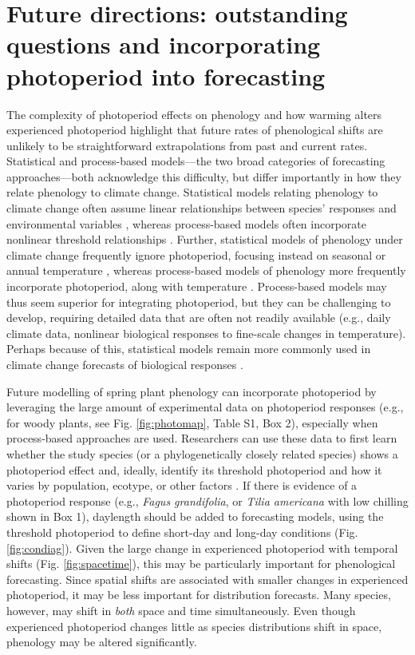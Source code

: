 \documentclass{article}
\begin{document}
\section*{Future directions: outstanding questions and incorporating photoperiod into forecasting}
\par The complexity of photoperiod effects on phenology and how warming alters experienced photoperiod highlight that future rates of phenological shifts are unlikely to be straightforward extrapolations from past and current rates. Statistical and process-based models---the two broad categories of forecasting approaches---both acknowledge this difficulty, but differ importantly in how they relate phenology to climate change. Statistical models relating phenology to climate change often assume linear relationships between species' responses and environmental variables \citep[e.g., ][]{flynn2018,ibanez2010}, whereas process-based models often incorporate nonlinear threshold relationships \citep[e.g.][]{chuine2001,morin2009}. Further, statistical models of phenology under climate change frequently ignore photoperiod, focusing instead on seasonal or annual temperature \citep[e.g.][but see \citet{richardson2013}]{diez2012,ibanez2010}, whereas process-based models of phenology more frequently incorporate photoperiod, along with temperature \citep{lundell2020,duputie2015,zhao2013,morin2009}. Process-based models may thus seem superior for integrating photoperiod, but they can be challenging to develop, requiring detailed data that are often not readily available (e.g., daily climate data, nonlinear biological responses to fine-scale changes in temperature). Perhaps because of this, statistical models remain more commonly used in climate change forecasts of biological responses \citep[e.g.,][]{garcia2016,Basler:2012,diez2012,zhu2012,ibanez2010}.

\par Future modelling of spring plant phenology can incorporate photoperiod by leveraging the large amount of experimental data on photoperiod responses (e.g., for woody plants, see Fig. \ref{fig:photomap}, Table S1, Box 2), especially when process-based approaches are used. Researchers can use these data to first learn whether the study species (or a phylogenetically closely related species) shows a photoperiod effect and, ideally, identify its threshold photoperiod and how it varies by population, ecotype, or other factors \citep{tobin2008,bradshaw2006}. If there is evidence of a photoperiod response (e.g., \emph{Fagus grandifolia}, or \emph{Tilia americana} with low chilling shown in Box 1), daylength should be added to forecasting models, using the threshold photoperiod to define short-day and long-day conditions (Fig. \ref{fig:condiag}). Given the large change in experienced photoperiod with temporal shifts (Fig. \ref{fig:spacetime}), this may be particularly important for phenological forecasting. Since spatial shifts are associated with smaller changes in experienced photoperiod, it may be less important for distribution forecasts. Many species, however, may shift in \emph{both} space and time simultaneously. Even though experienced photoperiod changes little as species distributions shift in space, phenology may be altered significantly.
\end{document}
